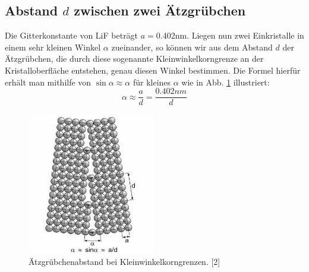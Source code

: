     \subsection{Abstand $d$ zwischen zwei Ätzgrübchen}

	Die Gitterkonstante von LiF beträgt $a = 0.402$nm. Liegen nun zwei Einkristalle in einem sehr kleinen Winkel $\alpha$ zueinander, so können wir aus dem Abstand $d$ der 
	Ätzgrübchen, die durch diese sogenannte Kleinwinkelkorngrenze an der Kristalloberfläche entstehen, genau diesen Winkel bestimmen. Die Formel hierfür erhält man mithilfe
	von $\sin{\alpha} \approx \alpha$ für kleines $\alpha$ wie in Abb. \ref{FigKorn} illustriert:
	\begin{equation}
		\alpha \approx \frac{a}{d} = \frac{0.402nm}{d}
	\end{equation}

	\begin{figure}[H]
            \centering
            \includegraphics[width=0.5\textwidth]{Images/Korn.JPG}
            \caption{Ätzgrübchenabstand bei Kleinwinkelkorngrenzen. [2]}
            \label{FigKorn}
        \end{figure}

